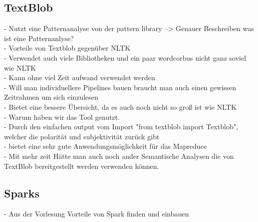 	
	
	\subsection{TextBlob}
	
	
	- Nutzt eine Patternanalyse von der  pattern library --> Genauer Beschreiben was ist eine Patternanlyse? \\
	- Vorteile von Textblob gegenüber NLTK\\
		- Verwendet auch viele Bibliotheken und ein paar wordcorbus nicht ganz soviel wie NLTK\\ 
		- Kann ohne viel Zeit aufwand verwendet werden\\
		- Will man individuellere Pipelines bauen braucht man auch einen gewissen Zeitrahmen um sich einzulesen\\
		- Bietet eine bessere Übersicht, da es auch noch nicht so groß ist wie NLTK\\
		
	- Warum haben wir das Tool genutzt.	\\
		- Durch den einfachen output vom Import "from textblob import Textblob", welcher die polarität und subjektivität zurück gibt\\
		- bietet eine sehr gute Anwendungsmöglichkeit für das Mapreduce\\
		- Mit mehr zeit Hätte man auch noch ander Semantische Analysen die von TextBlob bereitgestellt werden verwenden können.\\
		

	
	\subsection{Sparks}
	
	- Aus der Vorlesung Vorteile von Spark finden und einbauen	
	


	
